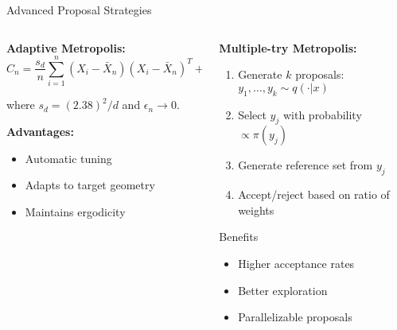 \documentclass[aspectratio=169,11pt]{beamer}
\begin{document}
\begin{frame}{Advanced Proposal Strategies}
\begin{columns}
\begin{column}{0.5\textwidth}
\textbf{Adaptive Metropolis:}
\[C_n = \frac{s_d}{n} \sum_{i=1}^n (X_i - \bar{X}_n)(X_i - \bar{X}_n)^T + s_d \epsilon_n I_d\]

where $s_d = (2.38)^2/d$ and $\epsilon_n \to 0$.

\vspace{0.3cm}
\textbf{Advantages:}
\begin{itemize}
\item Automatic tuning
\item Adapts to target geometry
\item Maintains ergodicity
\end{itemize}
\end{column}
\begin{column}{0.5\textwidth}
\textbf{Multiple-try Metropolis:}
\begin{enumerate}
\item Generate $k$ proposals: $y_1, \ldots, y_k \sim q(\cdot | x)$
\item Select $y_j$ with probability $\propto \pi(y_j)$
\item Generate reference set from $y_j$
\item Accept/reject based on ratio of weights
\end{enumerate}

\vspace{0.3cm}
\begin{block}{Benefits}
\begin{itemize}
\item Higher acceptance rates
\item Better exploration
\item Parallelizable proposals
\end{itemize}
\end{block}
\end{column}
\end{columns}
\end{frame}
\end{document}
